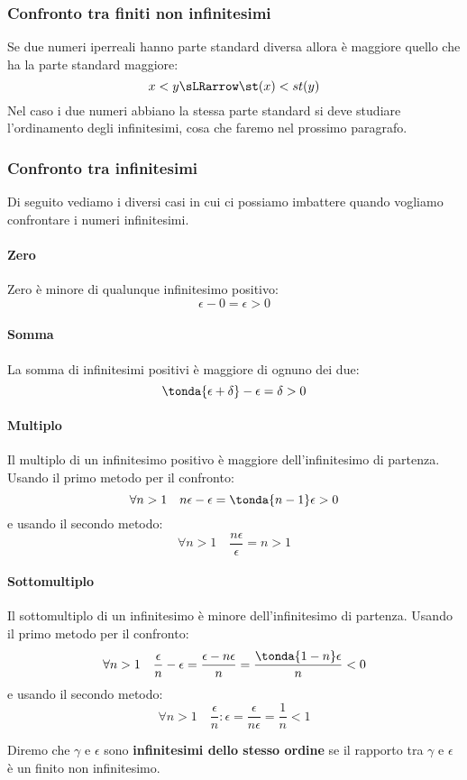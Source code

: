 \subsubsection{Confronto tra finiti non infinitesimi}
\label{subsubsec:insnum_confrontoreali}

Se due numeri iperreali hanno parte standard diversa allora è maggiore 
quello 
che ha la parte standard maggiore:
\[x < y \sLRarrow \st(x) < st(y)\]
Nel caso i due numeri abbiano la stessa parte standard si deve studiare 
l'ordinamento degli infinitesimi, cosa che faremo nel prossimo paragrafo.

\subsubsection{Confronto tra infinitesimi}
\label{subsubsec:insnum_confrontoreali}

Di seguito vediamo i diversi casi in cui ci possiamo 
imbattere quando vogliamo confrontare i numeri infinitesimi.

\paragraph{Zero}
Zero è minore di qualunque infinitesimo positivo:
\[\epsilon-0 = \epsilon>0\]
\paragraph{Somma}
La somma di infinitesimi positivi è maggiore di ognuno dei due:
\[\tonda{\epsilon+\delta}-\epsilon = \delta > 0\]
\paragraph{Multiplo}
Il multiplo di un infinitesimo positivo è maggiore dell'infinitesimo di 
partenza. Usando il primo metodo per il confronto:
\[\forall n > 1 \quad n\epsilon-\epsilon = \tonda{n-1}\epsilon > 0\]
e usando il secondo metodo: 
\[\forall n > 1 \quad \frac{n\epsilon}{\epsilon} = n > 1\]
\paragraph{Sottomultiplo}
Il sottomultiplo di un infinitesimo è minore dell'infinitesimo di partenza. 
Usando il primo metodo per il confronto:
\[\forall n > 1 \quad \frac{\epsilon}{n}-\epsilon = 
                      \frac{\epsilon-n\epsilon}{n} = 
                      \frac{\tonda{1-n}\epsilon}{n} < 0\]
e usando il secondo metodo: 
\[\forall n > 1 \quad \frac{\epsilon}{n}:\epsilon =
                      \frac{\epsilon}{n\epsilon} =
                      \frac{1}{n} < 1\]
\begin{definizione}
 Diremo che \(\gamma\) e \(\epsilon\) sono \textbf{infinitesimi dello 
stesso ordine} se il rapporto tra \(\gamma\) e \(\epsilon\) è un 
finito non infinitesimo.
\end{definizione}
